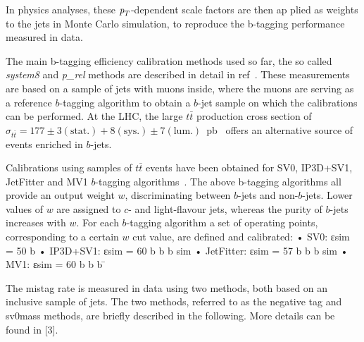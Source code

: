 In physics analyses, these ${\emph{p}_{T}}$-dependent scale factors are then ap plied as weights to the jets in Monte Carlo simulation, to reproduce the b-tagging performance measured in data.


The main b-tagging efficiency calibration methods used so far, the so called \emph{system8} and \emph{p_{rel}} methods are described in detail in ref~\cite{ATLAS-CONF-2011-089}.%
These measurements are based on a sample of jets with muons inside, where the muons are serving as a reference $b$-tagging algorithm to obtain a $b$-jet sample on which the calibrations can be performed. 
At the LHC, the large $t\bar{t}$ production cross section of $\sigma_{t\bar{t}} = 177 ± 3(\text{stat.})+8 (\text{sys.}) ± 7(\text{lum.})$~pb~\cite{ttbarXsection??????} offers an alternative source of events enriched in $b$-jets. %

Calibrations using samples of $t\bar{t}$ events have been obtained for SV0, IP3D+SV1, JetFitter and MV1 $b$-tagging algorithms~\cite{?????}. The above b-tagging algorithms all provide an output weight $w$, discriminating between $b$-jets and non-$b$-jets. Lower values of $w$ are assigned to $c$- and light-flavour jets, whereas the purity of $b$-jets increases with $w$. For each $b$-tagging algorithm a set of operating points, corresponding to a certain $w$ cut value, are defined and calibrated:
• SV0: εsim = 50%
b
• IP3D+SV1: εsim = 60%
b
b
b
sim
• JetFitter: εsim = 57%
b
b
b
sim
• MV1: εsim = 60%
b
b
b
 ̄


The mistag rate is measured in data using two methods, both based on an inclusive sample of jets.
The two methods, referred to as the negative tag and sv0mass methods, are briefly described in the
following. More details can be found in [3].



